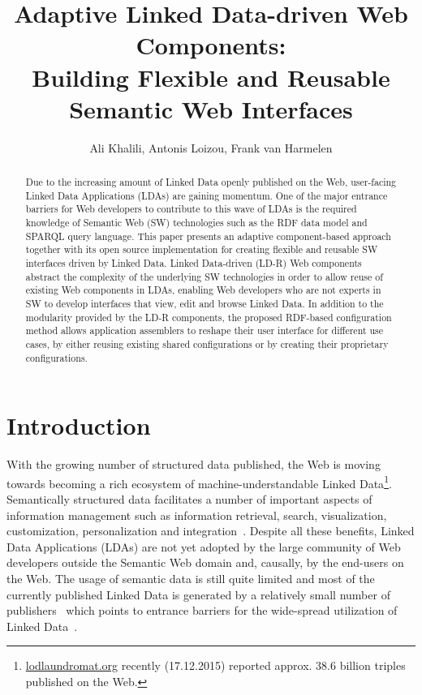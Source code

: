 \documentclass{llncs}
\begin{document}
\title{Adaptive Linked Data-driven Web Components:\\ \large{Building Flexible and Reusable Semantic Web Interfaces}}

\author{Ali Khalili, Antonis Loizou, Frank van Harmelen}

\maketitle

\begin{abstract}
Due to the increasing amount of Linked Data openly published on the Web, user-facing Linked Data Applications (LDAs) are gaining momentum.
One of the major entrance barriers for Web developers to contribute to this wave of LDAs is the required knowledge of Semantic Web (SW) technologies such as the RDF data model and SPARQL query language.
This paper presents an adaptive component-based approach together with its open source implementation for creating flexible and reusable SW interfaces driven by Linked Data.
Linked Data-driven (LD-R) Web components abstract the complexity of the underlying SW technologies in order to allow reuse of existing Web components in LDAs, enabling Web developers who are not experts in SW to develop interfaces that view, edit and browse Linked Data.
In addition to the modularity provided by the LD-R components, the proposed RDF-based configuration method allows application assemblers to reshape their user interface for different use cases, by either reusing existing shared configurations or by creating their proprietary configurations.

\end{abstract}

\section{Introduction}


With the growing number of structured data published, the Web is moving towards becoming a rich ecosystem of machine-understandable Linked Data\footnote{\url{lodlaundromat.org} recently (17.12.2015) reported approx. 38.6 billion triples published on the Web.}.
Semantically structured data facilitates a number of important aspects of
information management such as information retrieval, search, visualization, customization, personalization and integration~\cite{SCAJ-Khalili-2013}.
Despite all these benefits, Linked Data Applications (LDAs) are not yet adopted by the large community of Web developers outside the Semantic Web domain and, causally, by the end-users on the Web.
The usage of semantic data is still quite limited and most of the currently published Linked Data is generated by a relatively small number of publishers~\cite{ontowiki-swj} which points to entrance barriers for the wide-spread utilization of Linked Data~\cite{Benson2014}.
\end{document}
